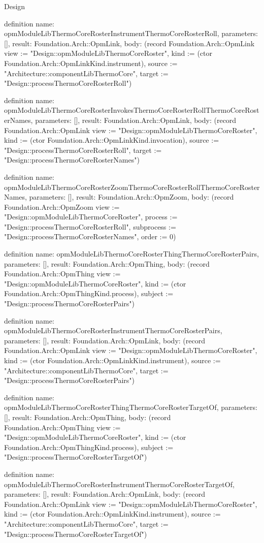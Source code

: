 \begin{lexlean}{Design}
\begin{semanticmodule}
definition{
  name: opmModuleLibThermoCoreRosterInstrumentThermoCoreRosterRoll,
  parameters: [],
  result: Foundation.Arch::OpmLink,
  body: (record Foundation.Arch::OpmLink {view := "Design::opmModuleLibThermoCoreRoster", kind := (ctor Foundation.Arch::OpmLinkKind.instrument), source := "Architecture::componentLibThermoCore", target := "Design::processThermoCoreRosterRoll"})
}

definition{
  name: opmModuleLibThermoCoreRosterInvokesThermoCoreRosterRollThermoCoreRosterNames,
  parameters: [],
  result: Foundation.Arch::OpmLink,
  body: (record Foundation.Arch::OpmLink {view := "Design::opmModuleLibThermoCoreRoster", kind := (ctor Foundation.Arch::OpmLinkKind.invocation), source := "Design::processThermoCoreRosterRoll", target := "Design::processThermoCoreRosterNames"})
}

definition{
  name: opmModuleLibThermoCoreRosterZoomThermoCoreRosterRollThermoCoreRosterNames,
  parameters: [],
  result: Foundation.Arch::OpmZoom,
  body: (record Foundation.Arch::OpmZoom {view := "Design::opmModuleLibThermoCoreRoster", process := "Design::processThermoCoreRosterRoll", subprocess := "Design::processThermoCoreRosterNames", order := 0})
}

definition{
  name: opmModuleLibThermoCoreRosterThingThermoCoreRosterPairs,
  parameters: [],
  result: Foundation.Arch::OpmThing,
  body: (record Foundation.Arch::OpmThing {view := "Design::opmModuleLibThermoCoreRoster", kind := (ctor Foundation.Arch::OpmThingKind.process), subject := "Design::processThermoCoreRosterPairs"})
}

definition{
  name: opmModuleLibThermoCoreRosterInstrumentThermoCoreRosterPairs,
  parameters: [],
  result: Foundation.Arch::OpmLink,
  body: (record Foundation.Arch::OpmLink {view := "Design::opmModuleLibThermoCoreRoster", kind := (ctor Foundation.Arch::OpmLinkKind.instrument), source := "Architecture::componentLibThermoCore", target := "Design::processThermoCoreRosterPairs"})
}

definition{
  name: opmModuleLibThermoCoreRosterThingThermoCoreRosterTargetOf,
  parameters: [],
  result: Foundation.Arch::OpmThing,
  body: (record Foundation.Arch::OpmThing {view := "Design::opmModuleLibThermoCoreRoster", kind := (ctor Foundation.Arch::OpmThingKind.process), subject := "Design::processThermoCoreRosterTargetOf"})
}

definition{
  name: opmModuleLibThermoCoreRosterInstrumentThermoCoreRosterTargetOf,
  parameters: [],
  result: Foundation.Arch::OpmLink,
  body: (record Foundation.Arch::OpmLink {view := "Design::opmModuleLibThermoCoreRoster", kind := (ctor Foundation.Arch::OpmLinkKind.instrument), source := "Architecture::componentLibThermoCore", target := "Design::processThermoCoreRosterTargetOf"})
}


\end{semanticmodule}
\end{lexlean}
